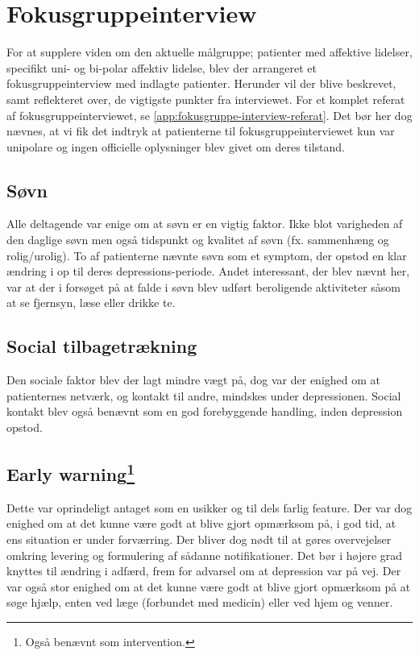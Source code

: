 \section{Fokusgruppeinterview}
For at supplere viden om den aktuelle målgruppe; patienter med affektive lidelser, specifikt uni- og bi-polar affektiv lidelse, blev der arrangeret et fokusgruppeinterview med indlagte patienter.
Herunder vil der blive beskrevet, samt reflekteret over, de vigtigste punkter fra interviewet.
For et komplet referat af fokusgruppeinterviewet, se \cref{app:fokusgruppe-interview-referat}.
Det bør her dog nævnes, at vi fik det indtryk at patienterne til fokusgruppeinterviewet kun var unipolare og ingen officielle oplysninger blev givet om deres tilstand.

\subsection{Søvn}
Alle deltagende var enige om at søvn er en vigtig faktor.
Ikke blot varigheden af den daglige søvn men også tidspunkt og kvalitet af søvn (fx. sammenhæng og rolig/urolig).
To af patienterne nævnte søvn som et symptom, der opstod en klar ændring i op til deres depressions-periode.
Andet interessant, der blev nævnt her, var at der i forsøget på at falde i søvn blev udført beroligende aktiviteter såsom at se fjernsyn, læse eller drikke te.

\subsection{Social tilbagetrækning}
Den sociale faktor blev der lagt mindre vægt på, dog var der enighed om at patienternes netværk, og kontakt til andre, mindskes under depressionen.
Social kontakt blev også benævnt som en god forebyggende handling, inden depression opstod.

\subsection[Early warning]{Early warning\footnote{Også benævnt som intervention.}}
Dette var oprindeligt antaget som en usikker og til dels farlig feature.
Der var dog enighed om at det kunne være godt at blive gjort opmærksom på, i god tid, at ens situation er under forværring.
Der bliver dog nødt til at gøres overvejelser omkring levering og formulering af sådanne notifikationer.
Det bør i højere grad knyttes til ændring i adfærd, frem for advarsel om at depression var på vej.
Der var også stor enighed om at det kunne være godt at blive gjort opmærksom på at søge hjælp, enten ved læge (forbundet med medicin) eller ved hjem og venner.

